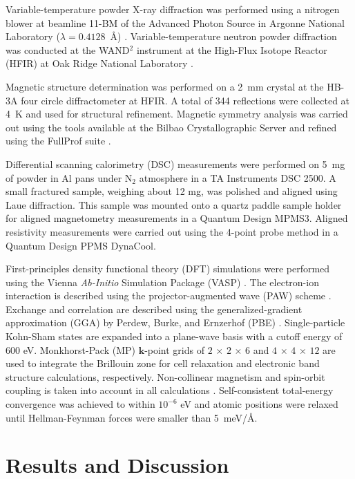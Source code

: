 \documentclass[10pt,doublespacing,edeposit]{uiucthesis2020}
\begin{document}
\begin{mainmatter}
Variable-temperature powder X-ray diffraction was performed using a nitrogen blower at beamline 11-BM of the Advanced Photon Source in Argonne National Laboratory ($\lambda = 0.4128$~\AA) \cite{wang_dedicated_2008}. Variable-temperature neutron powder diffraction was conducted at the WAND$^2$ instrument at the High-Flux Isotope Reactor (HFIR) at Oak Ridge National Laboratory \cite{Frontzek_new}.


Magnetic structure determination was performed on a 2~mm crystal at the HB-3A four circle diffractometer at HFIR. A total of 344 reflections were collected at 4~K and used for structural refinement. Magnetic symmetry analysis was carried out using the tools available at the Bilbao Crystallographic Server \cite{Perez-Mato2015}
and refined using the FullProf suite \cite{rodriguez-carvajal_recent_1993}.

Differential scanning calorimetry (DSC) measurements were performed on 5~mg of powder in Al pans under N$_2$ atmosphere in a TA Instruments DSC 2500. A small fractured sample, weighing about 12 mg, was polished and aligned using Laue diffraction. This sample was mounted onto a quartz paddle sample holder for aligned magnetometry measurements in a Quantum Design MPMS3. Aligned resistivity measurements were carried out using the 4-point probe method in a Quantum Design PPMS DynaCool.

First-principles density functional theory (DFT) simulations were performed using the Vienna \emph{Ab-Initio} Simulation Package  (VASP) \cite{Kresse:1996,Kresse:1999}. The electron-ion interaction is described using the projector-augmented wave (PAW) scheme \cite{Blochl:1994}. Exchange and correlation are described using the generalized-gradient approximation (GGA) by Perdew, Burke, and Ernzerhof  (PBE) \cite{Perdew:1997}. Single-particle Kohn-Sham states are expanded into a plane-wave basis with a cutoff energy of 600 eV. Monkhorst-Pack \cite{Monkhorst:1976} (MP) $\mathbf{k}$-point grids of $2\,\times\,2\,\times\,6$ and $4\,\times\,4\,\times\,12$ are used to integrate the Brillouin zone for cell relaxation and electronic band structure calculations, respectively.
Non-collinear magnetism and spin-orbit coupling is taken into account in all calculations \cite{Steiner2016}.
Self-consistent total-energy convergence was achieved to within $10^{-6}$ eV and atomic positions were relaxed until Hellman-Feynman forces were smaller than 5~meV/\AA.

\section{Results and Discussion}


\end{mainmatter}
\end{document}
